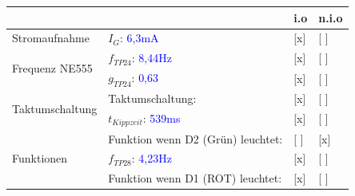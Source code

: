 \renewcommand{\arraystretch}{2}
\begin{tabularx}{\textwidth}{p{}| p{} | p{} | p{}}

 &  & i.o & n.i.o \\

\hline

Stromaufnahme & $I_{G}$: \textcolor{blue}{6,3mA} & [x] & [ ] \\

\hline

\multirow{2}{*}{Frequenz NE555 }
		& $f_{TP24}$: \textcolor{blue}{8,44Hz}				& [x] & [ ] \\
		& $g_{TP24}$: \textcolor{blue}{0,63}				& [x] & [ ] \\

\hline

\multirow{2}{*}{Taktumschaltung}
		& Taktumschaltung:									&	[x] & [ ] 	\\
		& $t_{Kippzeit}$: \textcolor{blue}{539ms}			&	[x]	& [ ] 	\\
	
\hline		
		
\multirow{3}{*}{Funktionen}
		& Funktion wenn D2 (Grün) leuchtet:  			& [ ] & [x] 	\\
		& $f_{TP28}$: 	\textcolor{blue}{4,23Hz}		& [x] & [ ] 	\\
		& Funktion wenn D1 (ROT) leuchtet:				& [x] & [ ] 	\\ 

\end{tabularx}
\renewcommand{\arraystretch}{1}

